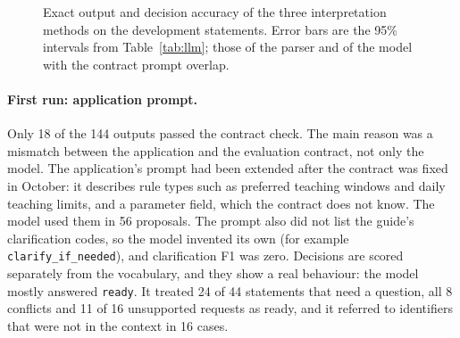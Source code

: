 \begin{figure}[t]
\centering
{}
\caption{Exact output and decision accuracy of the three interpretation methods on the development statements. Error bars are the 95\% intervals from Table~\ref{tab:llm}; those of the parser and of the model with the contract prompt overlap.}
\label{fig:llm}
\end{figure}

\paragraph{First run: application prompt.} Only 18 of the 144 outputs passed the contract check. The main reason was a mismatch between the application and the evaluation contract, not only the model. The application's prompt had been extended after the contract was fixed in October: it describes rule types such as preferred teaching windows and daily teaching limits, and a parameter field, which the contract does not know. The model used them in 56 proposals. The prompt also did not list the guide's clarification codes, so the model invented its own (for example \texttt{clarify\_if\_needed}), and clarification F1 was zero. Decisions are scored separately from the vocabulary, and they show a real behaviour: the model mostly answered \texttt{ready}. It treated 24 of 44 statements that need a question, all 8 conflicts and 11 of 16 unsupported requests as ready, and it referred to identifiers that were not in the context in 16 cases.

